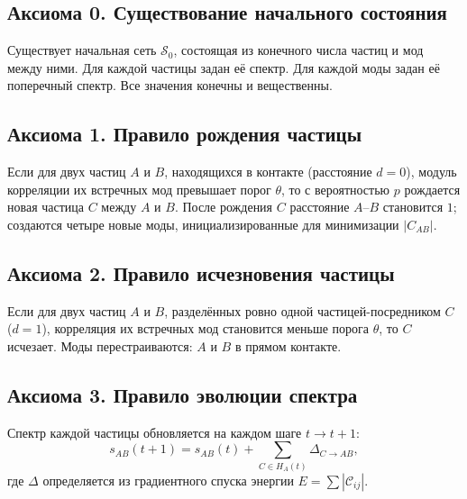 \documentclass[12pt,a4paper]{article}
\begin{document}
\begin{abstract}
Представлена система из двенадцати аксиом, описывающих механику растущей сети частиц и мод. Все величины определяются либо из начального состояния сети, либо из предыдущего состояния. Рекурсивные определения заменены на конструктивные правила эволюции. Вопрос о причинах конкретного выбора начального состояния и параметров модели оставлен открытым. Аксиомы образуют замкнутую систему, готовую к программной реализации и проверке на соответствие наблюдаемой физике.

\bigskip
\noindent\textbf{Ключевые слова:} Теория Мод, аксиоматизация, эволюционная версия, без рекурсий.
\end{abstract}

\subsection{Аксиома 0. Существование начального состояния}
Существует начальная сеть $\mathcal{S}_0$, состоящая из конечного числа частиц и мод между ними. Для каждой частицы задан её спектр. Для каждой моды задан её поперечный спектр. Все значения конечны и вещественны.

\subsection{Аксиома 1. Правило рождения частицы}
Если для двух частиц $A$ и $B$, находящихся в контакте (расстояние $d = 0$), модуль корреляции их встречных мод превышает порог $\theta$, то с вероятностью $p$ рождается новая частица $C$ между $A$ и $B$. После рождения $C$ расстояние $A$--$B$ становится $1$; создаются четыре новые моды, инициализированные для минимизации $|C_{AB}|$.

\subsection{Аксиома 2. Правило исчезновения частицы}
Если для двух частиц $A$ и $B$, разделённых ровно одной частицей-посредником $C$ ($d = 1$), корреляция их встречных мод становится меньше порога $\theta$, то $C$ исчезает. Моды перестраиваются: $A$ и $B$ в прямом контакте.

\subsection{Аксиома 3. Правило эволюции спектра}
Спектр каждой частицы обновляется на каждом шаге $t \to t+1$:
\begin{equation}
    s_{AB}(t+1) = s_{AB}(t) + \sum_{C \in H_A(t)} \Delta_{C \to AB},
\end{equation}
где $\Delta$ определяется из градиентного спуска энергии $E = \sum |\mathcal{C}_{ij}|$.
\end{document}
